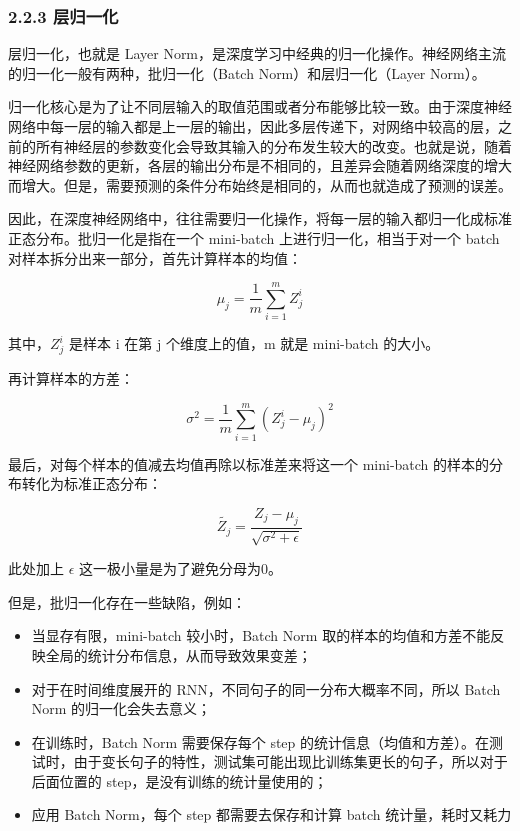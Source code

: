 \documentclass[12pt,a4paper]{book}
\begin{document}
\subsubsection{2.2.3 层归一化}\label{ux5c42ux5f52ux4e00ux5316}

层归一化，也就是 Layer
Norm，是深度学习中经典的归一化操作。神经网络主流的归一化一般有两种，批归一化（Batch
Norm）和层归一化（Layer Norm）。

归一化核心是为了让不同层输入的取值范围或者分布能够比较一致。由于深度神经网络中每一层的输入都是上一层的输出，因此多层传递下，对网络中较高的层，之前的所有神经层的参数变化会导致其输入的分布发生较大的改变。也就是说，随着神经网络参数的更新，各层的输出分布是不相同的，且差异会随着网络深度的增大而增大。但是，需要预测的条件分布始终是相同的，从而也就造成了预测的误差。

因此，在深度神经网络中，往往需要归一化操作，将每一层的输入都归一化成标准正态分布。批归一化是指在一个
mini-batch 上进行归一化，相当于对一个 batch
对样本拆分出来一部分，首先计算样本的均值：

\[
\mu_j = \frac{1}{m}\sum^{m}_{i=1}Z_j^{i}
\]

其中，\(Z_j^{i}\) 是样本 i 在第 j 个维度上的值，m 就是 mini-batch
的大小。

再计算样本的方差：

\[
\sigma^2 = \frac{1}{m}\sum^{m}_{i=1}(Z_j^i - \mu_j)^2
\]

最后，对每个样本的值减去均值再除以标准差来将这一个 mini-batch
的样本的分布转化为标准正态分布：

\[
\widetilde{Z_j} = \frac{Z_j - \mu_j}{\sqrt{\sigma^2 + \epsilon}}
\]

此处加上 \(\epsilon\) 这一极小量是为了避免分母为0。

但是，批归一化存在一些缺陷，例如：

\begin{itemize}
\tightlist
\item
  当显存有限，mini-batch 较小时，Batch Norm
  取的样本的均值和方差不能反映全局的统计分布信息，从而导致效果变差；
\item
  对于在时间维度展开的 RNN，不同句子的同一分布大概率不同，所以 Batch
  Norm 的归一化会失去意义；
\item
  在训练时，Batch Norm 需要保存每个 step
  的统计信息（均值和方差）。在测试时，由于变长句子的特性，测试集可能出现比训练集更长的句子，所以对于后面位置的
  step，是没有训练的统计量使用的；
\item
  应用 Batch Norm，每个 step 都需要去保存和计算 batch 统计量，耗时又耗力
\end{itemize}
\end{document}
